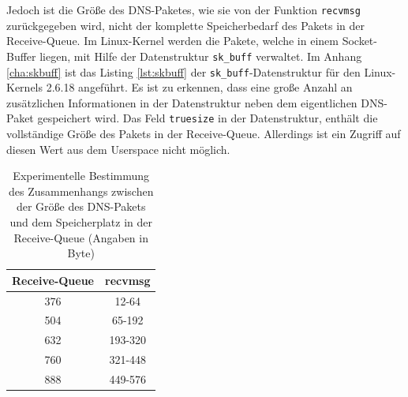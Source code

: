 \documentclass[a4paper, 12pt, BCOR10mm, DIV12, toc=bibliography, toc=listof, german]{scrbook}
\begin{document}
		

		Jedoch ist die Größe des DNS-Paketes, wie sie von der Funktion \texttt{recvmsg}
		zurückgegeben wird, nicht der komplette Speicherbedarf des Pakets in der Receive-Queue. Im
		Linux-Kernel werden die Pakete, welche in einem Socket-Buffer liegen, mit Hilfe der
		Datenstruktur \texttt{sk\_buff} verwaltet. Im Anhang \ref{cha:skbuff} ist das Listing
		\ref{lst:skbuff} der \texttt{sk\_buff}-Datenstruktur für den Linux-Kernels 2.6.18 angeführt. Es ist
		zu erkennen, dass eine große Anzahl an zusätzlichen Informationen in der Datenstruktur neben
		dem eigentlichen DNS-Paket gespeichert wird. Das Feld \texttt{truesize} in der Datenstruktur,
		enthält die vollständige Größe des Pakets in der Receive-Queue. Allerdings ist ein Zugriff auf
		diesen Wert aus dem Userspace nicht möglich.

		\begin{table}
			\centering
			\begin{tabular}{|c|c|}\hline
				Receive-Queue & recvmsg \\\hline\hline
				376 & 12-64	\\
				504 & 65-192	\\
				632 & 193-320	\\
				760 & 321-448 \\
				888 &	449-576\\\hline
			\end{tabular}
			\caption{Experimentelle Bestimmung des Zusammenhangs zwischen der Größe des DNS-Pakets und dem
			Speicherplatz in der Receive-Queue (Angaben in Byte)}
			\label{tab:recvmsg}
		\end{table}
\end{document}
